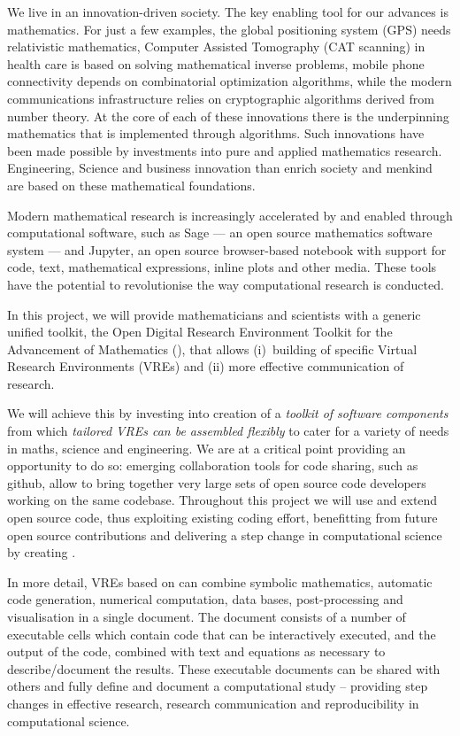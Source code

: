
We live in an innovation-driven society. The key enabling tool for our
advances is mathematics. For just a few examples, the global
positioning system (GPS) needs relativistic mathematics, Computer
Assisted Tomography (CAT scanning) in health care is based on solving
mathematical inverse problems, mobile phone connectivity depends on
combinatorial optimization algorithms, while the modern communications
infrastructure relies on cryptographic algorithms derived from number
theory. At the core of each of these innovations there is the
underpinning mathematics that is implemented through algorithms. Such
innovations have been made possible by investments into pure and
applied mathematics research. Engineering, Science and business
innovation than enrich society and menkind are based on these
mathematical foundations.

Modern mathematical research is increasingly accelerated by and
enabled through computational software, such as Sage --- an open source
mathematics software system --- and Jupyter, an open source browser-based
notebook with support for code, text, mathematical expressions, inline
plots and other media. These tools have the potential to
revolutionise the way computational research is conducted. 

In this project, we will provide mathematicians and scientists with a
generic unified toolkit, the Open Digital Research Environment Toolkit
for the Advancement of Mathematics (\TheProject), that allows
(i)~building of specific Virtual Research Environments (VREs) and (ii)
more effective communication of research.


We will achieve this by investing into creation of a \emph{toolkit of
  software components} from which \emph{tailored VREs can be assembled
  flexibly} to cater for a variety of needs in maths, science and
engineering.  We are at a critical point providing an opportunity to
do so: emerging collaboration tools for code sharing, such as github,
allow to bring together very large sets of open source code developers
working on the same codebase. Throughout this project we will use and
extend open source code, thus exploiting existing coding effort,
benefitting from future open source contributions and delivering a
step change in computational science by creating \TheProject.

In more detail, VREs based on \TheProject can combine symbolic
mathematics, automatic code generation, numerical computation, data
bases, post-processing and visualisation in a single document. The
document consists of a number of executable cells which contain code
that can be interactively executed, and the output of the code,
combined with text and equations as necessary to describe/document the
results. These executable documents can be shared with others and
fully define and document a computational study -- providing step
changes in effective research, research communication and
reproducibility in computational science.

